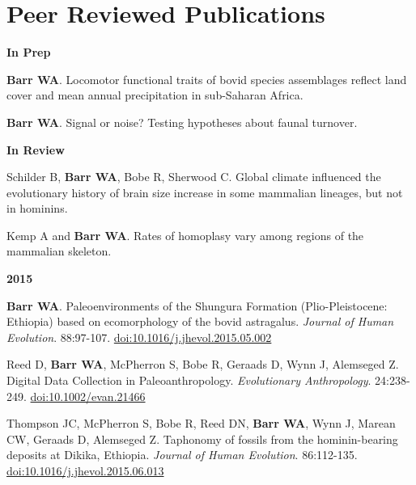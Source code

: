 \documentclass{article}
\begin{document}
\section*{Peer Reviewed Publications}

\begin{description*}
\item[] {\bfseries In Prep}
\item[] {\bfseries Barr WA}. Locomotor functional traits of bovid species assemblages reflect land cover and mean annual precipitation in sub-Saharan Africa. 
\item[] {\bfseries Barr WA}. Signal or noise? Testing hypotheses about faunal turnover.
\end{description*}

\begin{description*}
\item[] {\bfseries In Review}
\item[] Schilder B, {\bfseries Barr WA}, Bobe R, Sherwood C. Global climate influenced the evolutionary history of brain size increase in some mammalian lineages, but not in hominins.
\item[] Kemp A and {\bfseries Barr WA}. Rates of homoplasy vary among regions of the mammalian skeleton.
\end{description*}

\begin{description*}
\item[] {\bfseries 2015}
\item[] {\bfseries Barr WA}. Paleoenvironments of the Shungura Formation (Plio-Pleistocene: Ethiopia) based on ecomorphology of the bovid astragalus. \emph{Journal of Human Evolution}. 88:97-107. \href{http://dx.doi.org/10.1016/j.jhevol.2015.05.002}{doi:10.1016/j.jhevol.2015.05.002}
\item Reed D, {\bfseries Barr WA}, McPherron S, Bobe R, Geraads D, Wynn J, Alemseged Z. Digital Data Collection in Paleoanthropology. \emph{Evolutionary Anthropology}. 24:238-249. \href{http://dx.doi.org/10.1002/evan.21466}{doi:10.1002/evan.21466}
\item[] Thompson JC, McPherron S, Bobe R, Reed DN, {\bfseries Barr WA}, Wynn J, Marean CW, Geraads D, Alemseged Z. Taphonomy of fossils from the hominin-bearing deposits at Dikika, Ethiopia. \emph{Journal of Human Evolution}. 86:112-135. \href{http://dx.doi.org/10.1016/j.jhevol.2015.06.013}{doi:10.1016/j.jhevol.2015.06.013}


\end{description*}
\end{document}

